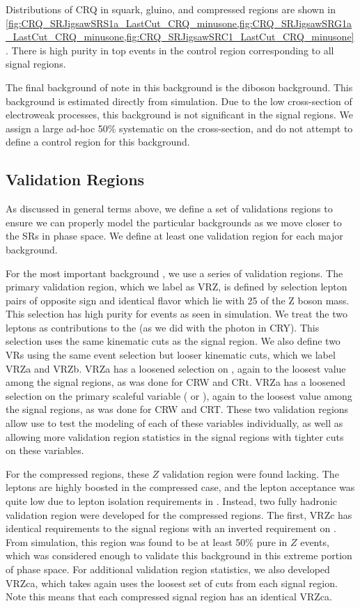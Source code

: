 Distributions of CRQ in squark, gluino, and compressed regions are shown in \ref{fig:CRQ_SRJigsawSRS1a_LastCut_CRQ_minusone,fig:CRQ_SRJigsawSRG1a_LastCut_CRQ_minusone,fig:CRQ_SRJigsawSRC1_LastCut_CRQ_minusone}.
There is high purity in top events in the control region corresponding to all signal regions.

The final background of note in this background is the diboson background.
This background is estimated directly from simulation.
Due to the low cross-section of electroweak processes, this background is not significant in the signal regions.
We assign a large ad-hoc 50\% systematic on the cross-section, and do not attempt to define a control region for this background.



\subsection{Validation Regions}

As discussed in general terms above, we define a set of validations regions to ensure we can properly model the particular backgrounds as we move closer to the SRs in phase space.
We define at least one validation region for each major background.

For the most important background \Zvv, we use a series of validation regions.
The primary validation region, which we label as VRZ, is defined by selection lepton pairs of opposite sign and identical flavor which lie with 25 \GeV of the Z boson mass.
This selection has high purity for \Zll events as seen in simulation.
We treat the two leptons as contributions to the \met (as we did with the photon in CRY).
This selection uses the same kinematic cuts as the signal region.
We also define two VRs using the same event selection but looser kinematic cuts, which we label VRZa and VRZb.
VRZa has a loosened selection on , again to the loosest value among the signal regions, as was done for CRW and CRt.
VRZa has a loosened selection on the primary scaleful variable  ( or ), again to the loosest value among the signal regions, as was done for CRW and CRT.
These two validation regions allow use to test the modeling of each of these variables individually, as well as allowing more validation region statistics in the signal regions with tighter cuts on these variables.

For the compressed regions, these $Z$ validation region were found lacking.
The leptons are highly boosted in the compressed case, and the lepton acceptance was quite low due to lepton isolation requirements in \deltaR.
Instead, two fully hadronic validation region were developed for the compressed regions.
The first, VRZc has identical requirements to the signal regions with an inverted requirement on \dphiISR.
From simulation, this region was found to be at least 50\% pure in $Z$ events, which was considered enough to validate this background in this extreme portion of phase space.
For additional validation region statistics, we also developed VRZca, which takes again uses the loosest set of cuts from each signal region.
Note this means that each compressed signal region has an identical VRZca.

